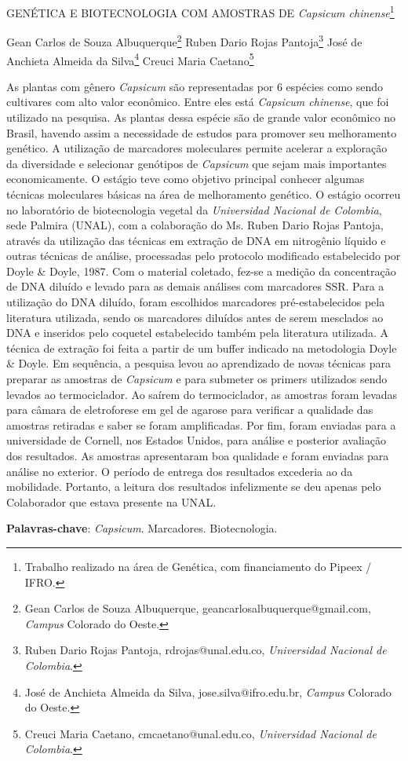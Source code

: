 \documentclass[article,12pt,onesidea,4paper,english,brazil]{abntex2}
\begin{document}
	
	
	\frenchspacing 
	
	\begin{center}
		\LARGE GENÉTICA E BIOTECNOLOGIA COM AMOSTRAS DE \textit{Capsicum chinense}\footnote{Trabalho realizado na área de Genética, com financiamento do Pipeex / IFRO.}
		
		\normalsize
		Gean Carlos de Souza Albuquerque\footnote{Gean Carlos de Souza Albuquerque, geancarlosalbuquerque@gmail.com, \textit{Campus} Colorado do	Oeste.} 
		Ruben Dario Rojas Pantoja\footnote{Ruben Dario Rojas Pantoja, rdrojas@unal.edu.co, \textit{Universidad Nacional de Colombia}.} 
		José de Anchieta Almeida da Silva\footnote{José de Anchieta Almeida da Silva, jose.silva@ifro.edu.br, \textit{Campus} Colorado do Oeste.} 
		Creuci Maria Caetano\footnote{Creuci Maria Caetano, cmcaetano@unal.edu.co, \textit{Universidad Nacional de Colombia}.} 
	\end{center}
	
	\noindent As plantas com gênero \textit{Capsicum} são representadas por 6 espécies como sendo
	cultivares com alto valor econômico. Entre eles está \textit{Capsicum chinense}, que foi
	utilizado na pesquisa. As plantas dessa espécie são de grande valor econômico no
	Brasil, havendo assim a necessidade de estudos para promover seu melhoramento
	genético. A utilização de marcadores moleculares permite acelerar a exploração da
	diversidade e selecionar genótipos de \textit{Capsicum} que sejam mais importantes
	economicamente. O estágio teve como objetivo principal conhecer algumas técnicas
	moleculares básicas na área de melhoramento genético. O estágio ocorreu no
	laboratório de biotecnologia vegetal da \textit{Universidad Nacional de Colombia}, sede
	Palmira (UNAL), com a colaboração do Ms. Ruben Dario Rojas Pantoja, através da
	utilização das técnicas em extração de DNA em nitrogênio líquido e outras técnicas
	de análise, processadas pelo protocolo modificado estabelecido por Doyle \& Doyle,
	1987. Com o material coletado, fez-se a medição da concentração de DNA diluído e
	levado para as demais análises com marcadores SSR. Para a utilização do DNA
	diluído, foram escolhidos marcadores pré-estabelecidos pela literatura utilizada,
	sendo os marcadores diluídos antes de serem mesclados ao DNA e inseridos pelo
	coquetel estabelecido também pela literatura utilizada. A técnica de extração foi feita
	a partir de um buffer indicado na metodologia Doyle \& Doyle. Em sequência, a
	pesquisa levou ao aprendizado de novas técnicas para preparar as amostras de
	\textit{Capsicum} e para submeter os primers utilizados sendo levados ao termociclador. Ao
	saírem do termociclador, as amostras foram levadas para câmara de eletroforese em
	gel de agarose para verificar a qualidade das amostras retiradas e saber se foram
	amplificadas. Por fim, foram enviadas para a universidade de Cornell, nos Estados
	Unidos, para análise e posterior avaliação dos resultados. As amostras
	apresentaram boa qualidade e foram enviadas para análise no exterior. O período
	de entrega dos resultados excederia ao da mobilidade. Portanto, a leitura dos
	resultados infelizmente se deu apenas pelo Colaborador que estava presente na
	UNAL.
	
	\vspace{\onelineskip}
	
	\noindent
	\textbf{Palavras-chave}: \textit{Capsicum}. Marcadores. Biotecnologia.
	
\end{document}
